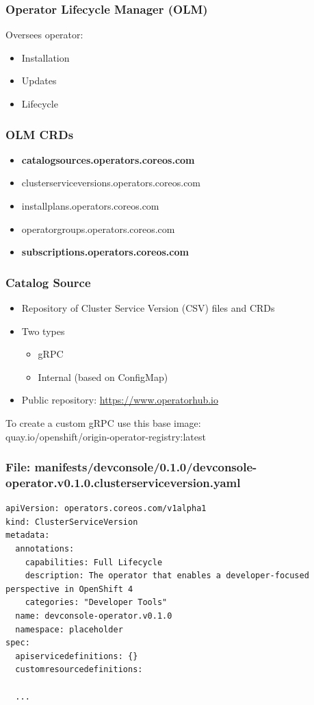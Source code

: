 \documentclass[aspectratio=169]{beamer}
\begin{document}
\begin{frame}
  \frametitle{Operator Lifecycle Manager (OLM)}

  Oversees operator:
  \begin{itemize}
  \item Installation
  \item Updates
  \item Lifecycle
  \end{itemize}

\end{frame}

\begin{frame}
  \frametitle{OLM CRDs}
  \begin{itemize}
    \item {\bf catalogsources.operators.coreos.com}
    \item clusterserviceversions.operators.coreos.com
    \item installplans.operators.coreos.com
    \item operatorgroups.operators.coreos.com
    \item {\bf subscriptions.operators.coreos.com}
  \end{itemize}
\end{frame}


\begin{frame}

  \frametitle{Catalog Source}

  \begin{itemize}
  \item Repository of Cluster Service Version (CSV) files and CRDs
  \item Two types
    \begin{itemize}
    \item gRPC
    \item Internal (based on ConfigMap)
    \end{itemize}
  \item Public repository: \url{https://www.operatorhub.io}
  \end{itemize}

  To create a custom gRPC use this base image:\\
  quay.io/openshift/origin-operator-registry:latest

\end{frame}

\begin{frame}[fragile]

  \frametitle{File: manifests/devconsole/0.1.0/devconsole-operator.v0.1.0.clusterserviceversion.yaml}

  \begin{Verbatim}[fontsize=\small]
apiVersion: operators.coreos.com/v1alpha1
kind: ClusterServiceVersion
metadata:
  annotations:
    capabilities: Full Lifecycle
    description: The operator that enables a developer-focused perspective in OpenShift 4
    categories: "Developer Tools"
  name: devconsole-operator.v0.1.0
  namespace: placeholder
spec:
  apiservicedefinitions: {}
  customresourcedefinitions:

  ...
  \end{Verbatim}
\end{frame}
\end{document}
